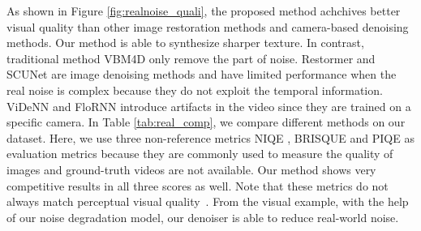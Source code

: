 \documentclass[10pt,twocolumn,letterpaper]{article}
\newlength \g
\begin{document}
As shown in Figure \ref{fig:realnoise_quali}, the proposed method achchives better visual quality than other image restoration methods and camera-based denoising methods. Our method is able to synthesize sharper texture.  In contrast, traditional method VBM4D \cite{maggioni2012bm4d} only remove the part of noise.
Restormer \cite{zamir2021restormer} and SCUNet \cite{zhang2022scunet} are image denoising methods and have limited performance when the real noise is complex because they do not exploit the temporal information.
ViDeNN \cite{claus2019videnn} and FloRNN \cite{li2022flornn} introduce artifacts in the video since they are trained on a specific camera.
In Table \ref{tab:real_comp}, we compare different methods on our dataset. Here, we use three non-reference metrics NIQE \cite{mittal2012niqe}, BRISQUE \cite{mittal2011brisque} and PIQE \cite{venkatanath2015piqe} as evaluation metrics because they are commonly used to measure the quality of images and ground-truth videos are not available. Our method shows very competitive results in all three scores as well. Note that these metrics do not always match perceptual visual quality~\cite{lugmayr2020ntire}.
From the visual example, with the help of our noise degradation model, our denoiser is able to reduce real-world noise. 
\end{document}
